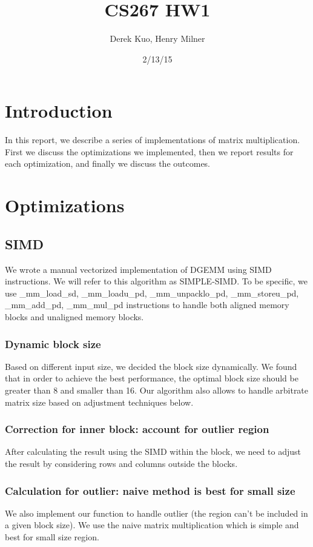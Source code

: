 \documentclass{article}
\author{Derek Kuo, Henry Milner}
\title{CS267 HW1}
\date{2/13/15}
\begin{document}
\maketitle

\section{Introduction}
In this report, we describe a series of implementations of matrix multiplication.  First we discuss the optimizations we implemented, then we report results for each optimization, and finally we discuss the outcomes.

\section{Optimizations}
\subsection{SIMD}
We wrote a manual vectorized implementation of DGEMM using SIMD instructions. We will refer to this algorithm as SIMPLE-SIMD. To be specific, we use \_mm\_load\_sd, \_mm\_loadu\_pd, \_mm\_unpacklo\_pd, \_mm\_storeu\_pd, \_mm\_add\_pd, \_mm\_mul\_pd instructions to handle both aligned memory blocks and unaligned memory blocks. 

\subsubsection {Dynamic block size}
Based on different input size, we decided the block size dynamically. We found that in order to achieve the best performance, the optimal block size should be greater than 8 and smaller than 16. Our algorithm also allows to handle arbitrate matrix size based on adjustment techniques below.

\subsubsection {Correction for inner block: account for outlier region}
After calculating the result using the SIMD within the block, we need to adjust the result by considering rows and columns outside the blocks.

\subsubsection {Calculation for outlier: naive method is best for small size}
We also implement our function to handle outlier (the region can't be included in a given block size). We use the naive matrix multiplication which is simple and best for small size region.
\end{document}
